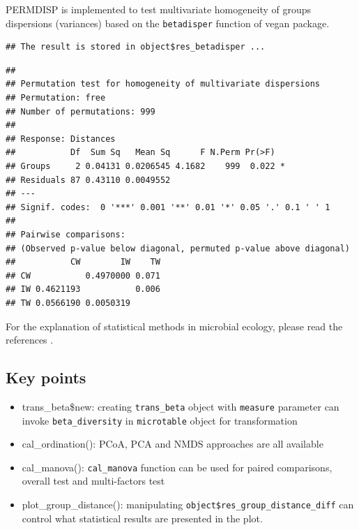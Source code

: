 \documentclass[
]{book}
\newenvironment{Shaded}{\begin{snugshade}}{\end{snugshade}}
\newcommand{\CommentTok}[1]{\textcolor[rgb]{0.56,0.35,0.01}{\textit{#1}}}
\newcommand{\FunctionTok}[1]{\textcolor[rgb]{0.13,0.29,0.53}{\textbf{#1}}}
\newcommand{\NormalTok}[1]{#1}
\newcommand{\SpecialCharTok}[1]{\textcolor[rgb]{0.81,0.36,0.00}{\textbf{#1}}}
\providecommand{\tightlist}{%
  \setlength{\itemsep}{0pt}\setlength{\parskip}{0pt}}
\begin{document}
PERMDISP\citep{Anderson_Navigating_2011} is implemented to test multivariate homogeneity of groups dispersions (variances) based on the \texttt{betadisper} function of vegan package.

\begin{Shaded}
\end{Shaded}

\begin{verbatim}
## The result is stored in object$res_betadisper ...
\end{verbatim}

\begin{Shaded}
\end{Shaded}

\begin{verbatim}
## 
## Permutation test for homogeneity of multivariate dispersions
## Permutation: free
## Number of permutations: 999
## 
## Response: Distances
##           Df  Sum Sq   Mean Sq      F N.Perm Pr(>F)  
## Groups     2 0.04131 0.0206545 4.1682    999  0.022 *
## Residuals 87 0.43110 0.0049552                       
## ---
## Signif. codes:  0 '***' 0.001 '**' 0.01 '*' 0.05 '.' 0.1 ' ' 1
## 
## Pairwise comparisons:
## (Observed p-value below diagonal, permuted p-value above diagonal)
##           CW        IW    TW
## CW           0.4970000 0.071
## IW 0.4621193           0.006
## TW 0.0566190 0.0050319
\end{verbatim}

For the explanation of statistical methods in microbial ecology, please read the references \citep{Ramette_Multivariate_2007, Buttigieg_guide_2014}.

\subsection{Key points}\label{key-points-4}

\begin{itemize}
\tightlist
\item
  trans\_beta\$new: creating \texttt{trans\_beta} object with \texttt{measure} parameter can invoke \texttt{beta\_diversity} in \texttt{microtable} object for transformation
\item
  cal\_ordination(): PCoA, PCA and NMDS approaches are all available
\item
  cal\_manova(): \texttt{cal\_manova} function can be used for paired comparisons, overall test and multi-factors test
\item
  plot\_group\_distance(): manipulating \texttt{object\$res\_group\_distance\_diff} can control what statistical results are presented in the plot.
\end{itemize}
\end{document}
